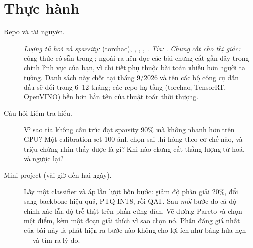 \documentclass[../../deep_learning.tex]{subfiles}
\begin{document}
\section{Thực hành}
\begin{description}
\item[Repo và tài nguyên.] \emph{Lượng tử hoá và sparsity:}  (torchao), , , , . \emph{Tỉa:} . \emph{Chưng cất cho thị giác:} công thức có sẵn trong ; ngoài ra nên đọc các bài chưng cất gần đây trong chính lĩnh vực của bạn, vì chi tiết phụ thuộc bài toán nhiều hơn người ta tưởng. Danh sách này chốt tại tháng 9/2026 và tên các bộ công cụ dẫn đầu sẽ đổi trong 6--12 tháng; các repo hạ tầng (torchao, TensorRT, OpenVINO) bền hơn hẳn tên của thuật toán thời thượng.

\item[Câu hỏi kiểm tra hiểu.] Vì sao tỉa không cấu trúc đạt sparsity 90\% mà không nhanh hơn trên GPU? Một calibration set 100 ảnh chọn sai thì hỏng theo cơ chế nào, và triệu chứng nhìn thấy được là gì? Khi nào chưng cất thắng lượng tử hoá, và ngược lại?

\item[Mini project (vài giờ đến hai ngày).] Lấy một classifier và áp lần lượt bốn bước: giảm độ phân giải 20\%, đổi sang backbone hiệu quả, PTQ INT8, rồi QAT. Sau \emph{mỗi} bước đo cả độ chính xác lẫn độ trễ thật trên phần cứng đích. Vẽ đường Pareto và chọn một điểm, kèm một đoạn giải thích vì sao chọn nó. Phần đáng giá nhất của bài này là phát hiện ra bước nào không cho lợi ích như bảng hứa hẹn --- và tìm ra lý do.

\end{description}
\end{document}
